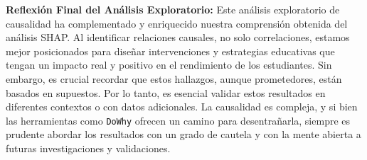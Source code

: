 \textbf{Reflexión Final del Análisis Exploratorio:} Este análisis exploratorio de causalidad ha complementado y enriquecido nuestra comprensión obtenida del análisis SHAP. Al identificar relaciones causales, no solo correlaciones, estamos mejor posicionados para diseñar intervenciones y estrategias educativas que tengan un impacto real y positivo en el rendimiento de los estudiantes. Sin embargo, es crucial recordar que estos hallazgos, aunque prometedores, están basados en supuestos. Por lo tanto, es esencial validar estos resultados en diferentes contextos o con datos adicionales. La causalidad es compleja, y si bien las herramientas como \texttt{DoWhy} ofrecen un camino para desentrañarla, siempre es prudente abordar los resultados con un grado de cautela y con la mente abierta a futuras investigaciones y validaciones.


